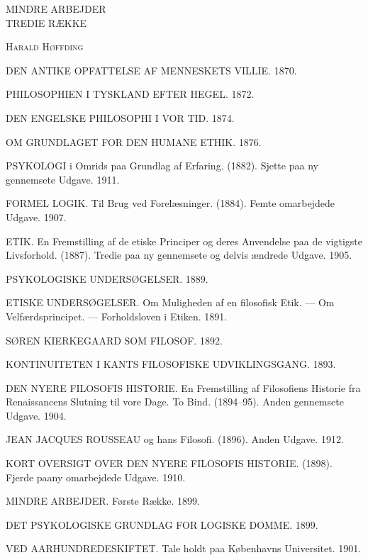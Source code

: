 \documentclass[12pt,a4paper,openany]{book}
\begin{document}
\frontmatter
\begin{titlepage}\centering\vspace*{4cm}
{\Large MINDRE ARBEJDER}\\[1ex]{\small TREDIE RÆKKE}
\end{titlepage}
\thispagestyle{empty}
\begin{center}\textsc{Harald Høffding}\end{center}
\begin{small}\setlength{\parindent}{0pt}\setlength{\parskip}{0.3ex}\everypar{\hangindent=1.5em}
DEN ANTIKE OPFATTELSE AF MENNESKETS VILLIE. 1870.\par
PHILOSOPHIEN I TYSKLAND EFTER HEGEL. 1872.\par
DEN ENGELSKE PHILOSOPHI I VOR TID. 1874.\par
OM GRUNDLAGET FOR DEN HUMANE ETHIK. 1876.\par
PSYKOLOGI i Omrids paa Grundlag af Erfaring. (1882). Sjette paa ny gennemsete Udgave. 1911.\par
FORMEL LOGIK. Til Brug ved Forelæsninger. (1884). Femte omarbejdede Udgave. 1907.\par
ETIK. En Fremstilling af de etiske Principer og deres Anvendelse paa de vigtigste Livsforhold. (1887). Tredie paa ny gennemsete og delvis ændrede Udgave. 1905.\par
PSYKOLOGISKE UNDERSØGELSER. 1889.\par
ETISKE UNDERSØGELSER. Om Muligheden af en filosofisk Etik. --- Om Velfærdsprincipet. --- Forholdsloven i Etiken. 1891.\par
SØREN KIERKEGAARD SOM FILOSOF. 1892.\par
KONTINUITETEN I KANTS FILOSOFISKE UDVIKLINGSGANG. 1893.\par
DEN NYERE FILOSOFIS HISTORIE. En Fremstilling af Filosofiens Historie fra Renaissancens Slutning til vore Dage. To Bind. (1894--95). Anden gennemsete Udgave. 1904.\par
JEAN JACQUES ROUSSEAU og hans Filosofi. (1896). Anden Udgave. 1912.\par
KORT OVERSIGT OVER DEN NYERE FILOSOFIS HISTORIE. (1898). Fjerde paany omarbejdede Udgave. 1910.\par
MINDRE ARBEJDER. Første Række. 1899.\par
DET PSYKOLOGISKE GRUNDLAG FOR LOGISKE DOMME. 1899.\par
VED AARHUNDREDESKIFTET. Tale holdt paa Københavns Universitet. 1901.\par

\end{small}
\end{document}
